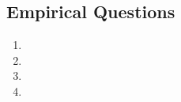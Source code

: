 \documentclass[11pt,a4paper]{article}
\begin{document}
	\setcounter{subsection}{2}
	\subsection{Empirical Questions}
	\begin{enumerate}
		\item 
		\item
		\item
		\item
	\end{enumerate}
\end{document}
